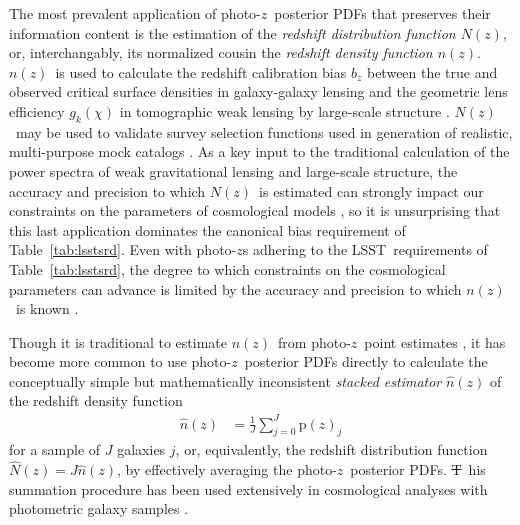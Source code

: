 \documentclass[iop]{emulateapj}
\newcommand{\todo}[3]{{\color{#2}\emph{#1}: #3}}
\newcommand{\aim}[1]{\todo{AIM}{red}{#1}}
\newcommand{\new}[2]{{\color{red}\sout{#1}}\ {\color{blue}{#2}}}%
\newcommand{\Tab}[1]{Table~\ref{#1}}
\newcommand{\project}[1]{\textsc{#1}}
\newcommand{\lsst}{\project{LSST}}
\newcommand{\pr}[1]{\ensuremath{\mathrm{p}(#1)}}
\newcommand{\pz}{photo-$z$}
\newcommand{\pzpdf}{\pz\ posterior PDF}
\newcommand{\nz}{$n(z)$}
\newcommand{\Nz}{$N(z)$}
\begin{document}
The most prevalent application of \pzpdf s that preserves their information content is the estimation of the \textit{redshift distribution function \Nz}, or, interchangably, its normalized cousin the \textit{redshift density function \nz}.
\nz\ is used to calculate the redshift calibration bias $b_{z}$ between the true and observed critical surface densities in galaxy-galaxy lensing \citep{mandelbaum_precision_2008} and the geometric lens efficiency $g_{k}(\chi)$ in tomographic weak lensing by large-scale structure \citep{benjamin_cfhtlens_2013}.
\Nz\ may be used to validate survey selection functions used in generation of realistic, multi-purpose mock catalogs \citep{norberg_2df_2002}.
As a key input to the traditional calculation of the power spectra of weak gravitational lensing and large-scale structure, the accuracy and precision to which \Nz\ is estimated can strongly impact our constraints on the parameters of cosmological models \citep{bonnett_using_2015,  masters_mapping_2015, viironen_high_2015, asorey_galaxy_2016, bonnett_redshift_2016, yang_calibrating_2018}, so it is unsurprising that this last application dominates the canonical bias requirement of Table~\ref{tab:lsstsrd}.
Even with \pz s adhering to the \lsst\ requirements of \Tab{tab:lsstsrd}, the degree to which constraints on the cosmological parameters can advance is limited by the accuracy and precision to which \nz\ is known \citep{abruzzo_impact_2019}.

Though it is traditional to estimate \nz\ from \pz\ point estimates \citep{abruzzo_impact_2019}, it has become more common to use \pzpdf s directly to calculate the conceptually simple but mathematically inconsistent \citep{hogg_data_2012} \textit{stacked estimator} $\hat{n}(z)$ of the redshift density function \citep{lima_estimating_2008}
\begin{align}
\label{eqn:stack}
\hat{n}(z) &= \frac{1}{J} \sum_{j = 0}^{J} \pr{z}_{j}
\end{align}
for a sample of $J$ galaxies $j$, or, equivalently, the redshift distribution function $\hat{N}(z) = J \hat{n}(z)$, by effectively averaging the \pzpdf s.
\new{T}{Despite its problems \citep{malz_how_2021}, t}his summation procedure has been used extensively in cosmological analyses with photometric galaxy samples \citep{mandelbaum_precision_2008, benjamin_cfhtlens_2013, kelly_weighing_2014}.
\end{document}
